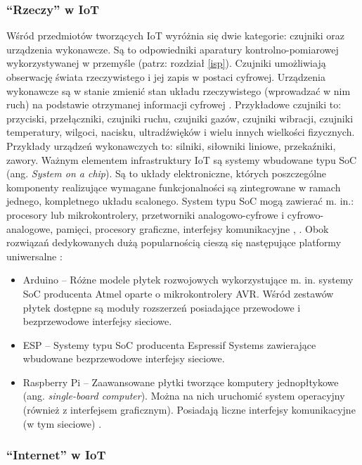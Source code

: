 \documentclass[a4paper, 12pt, twoside]{article}
\begin{document}
\subsubsection{``Rzeczy'' w IoT}

Wśród przedmiotów tworzących IoT wyróżnia się dwie kategorie: 
czujniki oraz urządzenia wykonawcze. Są to odpowiedniki aparatury kontrolno-pomiarowej 
wykorzystywanej w przemyśle (patrz: rozdział \ref{isp}). Czujniki umożliwiają
obserwację świata rzeczywistego i jej zapis w postaci cyfrowej.  
Urządzenia wykonawcze są w stanie zmienić stan układu rzeczywistego (wprowadzać w nim ruch)
na podstawie otrzymanej informacji cyfrowej \cite{iot-hype-to-reality}.
Przykładowe czujniki to: przyciski, przełączniki, czujniki ruchu, czujniki gazów,
czujniki wibracji, czujniki temperatury, wilgoci,
nacisku, ultradźwięków i wielu innych wielkości fizycznych. Przykłady urządzeń
wykonawczych to: silniki, siłowniki liniowe, przekaźniki, zawory. Ważnym elementem
infrastruktury IoT są systemy wbudowane typu SoC (ang. \emph{System on a chip}).  
Są to układy elektroniczne, których poszczególne komponenty realizujące wymagane 
funkcjonalności są zintegrowane w ramach jednego, kompletnego układu scalonego. 
System typu SoC mogą zawierać m. in.: procesory lub mikrokontrolery, przetworniki
analogowo-cyfrowe i cyfrowo-analogowe, pamięci, procesory graficzne, interfejsy komunikacyjne \cite{intro-to-iot}, \cite{soc}. 
Obok rozwiązań dedykowanych dużą popularnością cieszą się następujące platformy uniwersalne \cite{intro-to-iot}:

\begin{itemize}
    \item Arduino -- Różne modele płytek rozwojowych wykorzystujące m. in. systemy
    SoC producenta Atmel oparte o mikrokontrolery AVR. Wśród zestawów płytek
    dostępne są moduły rozszerzeń posiadające przewodowe i bezprzewodowe interfejsy sieciowe.
    \item ESP -- Systemy typu SoC producenta Espressif Systems zawierające wbudowane
    bezprzewodowe interfejsy sieciowe.
    \item Raspberry Pi -- Zaawansowane płytki tworzące komputery jednopłtykowe (ang. \emph{single-board computer}).    
    Można na nich uruchomić system operacyjny (również z interfejsem graficznym). Posiadają liczne 
    interfejsy komunikacyjne (w tym sieciowe) \cite{rpi}. 
\end{itemize}

\subsubsection{``Internet'' w IoT}
\end{document}
